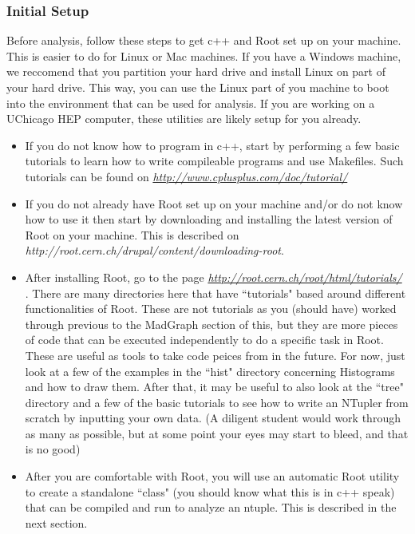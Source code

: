 \documentclass[12pt]{article}
\begin{document}
\subsubsection{Initial Setup}
Before analysis, follow these steps to get c++ and Root set up on your machine.  This is easier to do for Linux or Mac machines.  If you have a Windows machine, we reccomend that you partition your hard drive and install Linux on part of your hard drive. This way, you can use the Linux part of you machine to boot into the environment that can be used for analysis.  If you are working on a UChicago HEP computer, these utilities are likely setup for you already.  
\begin{itemize}
\item If you do not know how to program in c++, start by performing a few basic tutorials to learn how to write compileable programs and use Makefiles.  Such tutorials can be found on \href{http://www.cplusplus.com/doc/tutorial/}{\textit{http://www.cplusplus.com/doc/tutorial/}}
\item If you do not already have Root set up on your machine and/or do not know how to use it then start by downloading and installing the latest version of Root on your machine.  This is described on \textit{http://root.cern.ch/drupal/content/downloading-root}.  
\item After installing Root, go to the page \href{http://root.cern.ch/drupal/content/downloading-root}{\textit{http://root.cern.ch/root/html/tutorials/} }.  There are many directories here that have ``tutorials" based around different functionalities of Root.  These are not tutorials as you (should have) worked through previous to the MadGraph section of this, but they are more pieces of code that can be executed independently to do a specific task in Root.  These are useful as tools to take code peices from in the future.  For now, just look at a few of the examples in the ``hist" directory concerning Histograms and how to draw them.  After that, it may be useful to also look at the ``tree" directory and a few of the basic tutorials to see how to write an NTupler from scratch by inputting your own data.  (A diligent student would work through as many as possible, but at some point your eyes may start to bleed, and that is no good)
\item After you are comfortable with Root, you will use an automatic Root utility to create a standalone ``class" (you should know what this is in c++ speak) that can be compiled and run to analyze an ntuple.  This is described in the next section.
\end{itemize}
\end{document}
